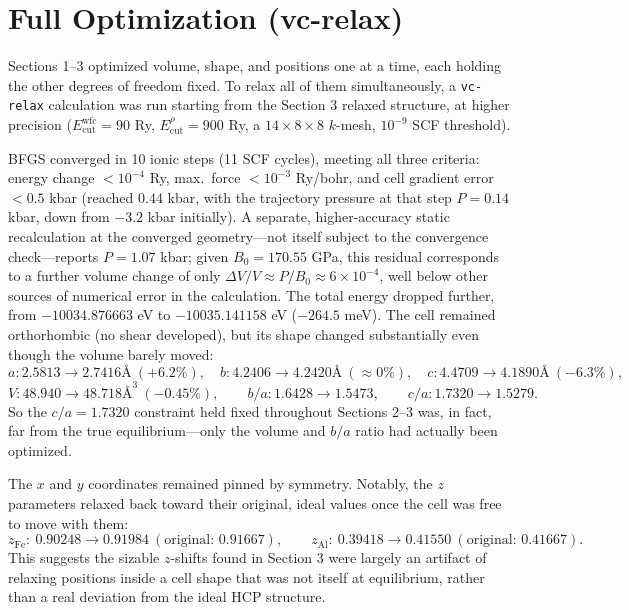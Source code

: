 \documentclass{article}
\begin{document}
\section{Full Optimization (vc-relax)}
Sections 1--3 optimized volume, shape, and positions one at a time, each holding the other degrees of freedom fixed. To relax all of them simultaneously, a \texttt{vc-relax} calculation was run starting from the Section 3 relaxed structure, at higher precision ($E_{\text{cut}}^{\text{wfc}}=90$ Ry, $E_{\text{cut}}^{\rho}=900$ Ry, a $14\times8\times8$ $k$-mesh, $10^{-9}$ SCF threshold).

BFGS converged in 10 ionic steps (11 SCF cycles), meeting all three criteria: energy change $<10^{-4}$ Ry, max.\ force $<10^{-3}$ Ry/bohr, and cell gradient error $<0.5$ kbar (reached $0.44$ kbar, with the trajectory pressure at that step $P=0.14$ kbar, down from $-3.2$ kbar initially). A separate, higher-accuracy static recalculation at the converged geometry---not itself subject to the convergence check---reports $P=1.07$ kbar; given $B_0=170.55$ GPa, this residual corresponds to a further volume change of only $\Delta V/V\approx P/B_0\approx6\times10^{-4}$, well below other sources of numerical error in the calculation. The total energy dropped further, from $-10034.876663$ eV to $-10035.141158$ eV ($-264.5$ meV). The cell remained orthorhombic (no shear developed), but its shape changed substantially even though the volume barely moved:
\[
a: 2.5813 \rightarrow 2.7416 \text{\AA} \ (+6.2\%), \quad b: 4.2406 \rightarrow 4.2420 \text{\AA} \ (\approx 0\%), \quad c: 4.4709 \rightarrow 4.1890 \text{\AA} \ (-6.3\%),
\]
\[
V: 48.940 \rightarrow 48.718 \text{\AA}^3 \ (-0.45\%), \qquad b/a: 1.6428 \rightarrow 1.5473, \qquad c/a: 1.7320 \rightarrow 1.5279.
\]
So the $c/a=1.7320$ constraint held fixed throughout Sections 2--3 was, in fact, far from the true equilibrium---only the volume and $b/a$ ratio had actually been optimized.

The $x$ and $y$ coordinates remained pinned by symmetry. Notably, the $z$ parameters relaxed back toward their original, ideal values once the cell was free to move with them:
\[
z_{\text{Fe}}: \ 0.90248 \rightarrow 0.91984 \ (\text{original: } 0.91667), \qquad z_{\text{Al}}: \ 0.39418 \rightarrow 0.41550 \ (\text{original: } 0.41667).
\]
This suggests the sizable $z$-shifts found in Section 3 were largely an artifact of relaxing positions inside a cell shape that was not itself at equilibrium, rather than a real deviation from the ideal HCP structure.
\end{document}
